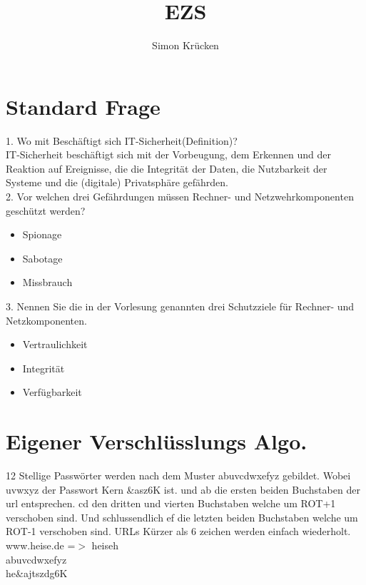 \documentclass[12pt,a4paper,oneside,ngerman]{article}
\title{EZS}
\author{Simon Krücken}
\begin{document}
    
\begin{titlepage}
\end{titlepage}
\tableofcontents


\section[Standard Fragen]{Standard Frage}

1. Wo mit Beschäftigt sich IT-Sicherheit(Definition)?\\
IT-Sicherheit beschäftigt sich mit der Vorbeugung, dem Erkennen und der Reaktion auf Ereignisse, die die Integrität der Daten, die Nutzbarkeit der Systeme und die (digitale) Privatsphäre gefährden.\\

2. Vor welchen drei Gefährdungen müssen Rechner- und Netzwehrkomponenten geschützt werden?\\
\begin{itemize}
	\item Spionage
	\item Sabotage
	\item Missbrauch
\end{itemize}

3. Nennen Sie die in der Vorlesung genannten drei Schutzziele für Rechner- und Netzkomponenten.\\
\begin{itemize}
	\item Vertraulichkeit
	\item Integrität
	\item Verfügbarkeit
\end{itemize}

\section{Eigener Verschlüsslungs Algo.}
12 Stellige Passwörter werden nach dem Muster abuvcdwxefyz gebildet.
Wobei uvwxyz der Passwort Kern \*\&asz6K\* ist. und \*ab\* die ersten beiden Buchstaben der url entsprechen.
\*cd\* den dritten und vierten Buchstaben welche um ROT+1 verschoben sind. Und schlussendlich \*ef\* die letzten beiden Buchstaben welche
um ROT-1 verschoben sind. URLs Kürzer als 6 zeichen werden einfach wiederholt.\\

www.heise.de =$>$ heiseh\\
abuvcdwxefyz\\
he\&ajtszdg6K\\
\end{document}
